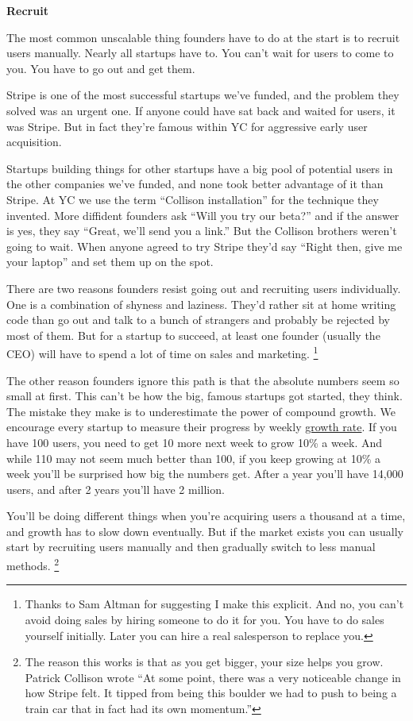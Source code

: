 \documentclass[12pt]{book}
\begin{document}
\textbf{Recruit}

The most common unscalable thing founders have to do at the start is to
recruit users manually. Nearly all startups have to. You can't wait for
users to come to you. You have to go out and get them.

Stripe is one of the most successful startups we've funded, and the
problem they solved was an urgent one. If anyone could have sat back and
waited for users, it was Stripe. But in fact they're famous within YC
for aggressive early user acquisition.

Startups building things for other startups have a big pool of potential
users in the other companies we've funded, and none took better
advantage of it than Stripe. At YC we use the term ``Collison
installation'' for the technique they invented. More diffident founders
ask ``Will you try our beta?'' and if the answer is yes, they say
``Great, we'll send you a link.'' But the Collison brothers weren't
going to wait. When anyone agreed to try Stripe they'd say ``Right then,
give me your laptop'' and set them up on the spot.

There are two reasons founders resist going out and recruiting users
individually. One is a combination of shyness and laziness. They'd
rather sit at home writing code than go out and talk to a bunch of
strangers and probably be rejected by most of them. But for a startup to
succeed, at least one founder (usually the CEO) will have to spend a lot
of time on sales and marketing. \footnote{Thanks to Sam Altman for suggesting I make this explicit. And
no, you can't avoid doing sales by hiring someone to do it for you. You
have to do sales yourself initially. Later you can hire a real
salesperson to replace you.}

The other reason founders ignore this path is that the absolute numbers
seem so small at first. This can't be how the big, famous startups got
started, they think. The mistake they make is to underestimate the power
of compound growth. We encourage every startup to measure their progress
by weekly \href{growth.html}{growth rate}. If you have 100 users, you
need to get 10 more next week to grow 10\% a week. And while 110 may not
seem much better than 100, if you keep growing at 10\% a week you'll be
surprised how big the numbers get. After a year you'll have 14,000
users, and after 2 years you'll have 2 million.

You'll be doing different things when you're acquiring users a thousand
at a time, and growth has to slow down eventually. But if the market
exists you can usually start by recruiting users manually and then
gradually switch to less manual methods. \footnote{The reason this works is that as you get bigger, your size helps
you grow. Patrick Collison wrote ``At some point, there was a very
noticeable change in how Stripe felt. It tipped from being this boulder
we had to push to being a train car that in fact had its own momentum.''}
\end{document}
